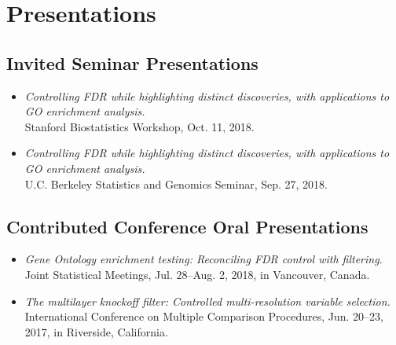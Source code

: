 \documentclass[letterpaper]{article}
\begin{document}
\section*{Presentations}

\subsection*{Invited Seminar Presentations}
\begin{itemize}\addtolength{\itemsep}{-0.2\baselineskip}
	\item \textit{Controlling FDR while highlighting distinct discoveries, with applications to GO enrichment analysis.} \\ Stanford Biostatistics Workshop, Oct. 11, 2018. 
	\item \textit{Controlling FDR while highlighting distinct discoveries, with applications to GO enrichment analysis.} \\U.C. Berkeley Statistics and Genomics Seminar, Sep. 27, 2018.
\end{itemize}

\subsection*{Contributed Conference Oral Presentations}
\begin{itemize}\addtolength{\itemsep}{-0.2\baselineskip}
	\item \textit{Gene Ontology enrichment testing: Reconciling FDR control with filtering.} \\
	Joint Statistical Meetings, Jul. 28--Aug. 2, 2018, in Vancouver, Canada.
	\item \textit{The multilayer knockoff filter: Controlled multi-resolution variable selection.} \\ International Conference on Multiple Comparison Procedures, Jun. 20--23, 2017, in Riverside, California.
\end{itemize}
\end{document}
